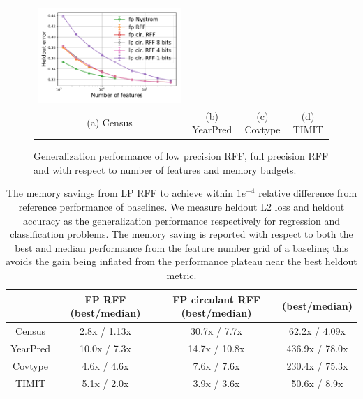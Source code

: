 \begin{figure}
\begin{tabular}{c@{\hskip 0in}c@{\hskip 0in}c@{\hskip 0in}c}
		\includegraphics[width=0.3\linewidth]{figures/timit_error_vs_n_feat.pdf} \\
		(a) Census & (b) YearPred & (c) Covtype & (d) TIMIT \\
	\end{tabular}
	\caption{Generalization performance of low precision RFF, full precision RFF and \Nystrom with respect to number of features and memory budgets.}
	\label{fig:generalization_col}
\end{figure}


\begin{table}
	\centering
	\begin{tabular}{c c c c}
		\hline
		& FP RFF (best/median) & FP circulant RFF (best/median) & \Nystrom (best/median) \\
		\hline
		\hline
		Census & 2.8x / 1.13x & 30.7x / 7.7x & 62.2x / 4.09x \\
		YearPred & 10.0x / 7.3x & 14.7x / 10.8x & 436.9x / 78.0x \\ 
		Covtype & 4.6x / 4.6x & 7.6x / 7.6x & 230.4x / 75.3x \\ 
		TIMIT & 5.1x / 2.0x & 3.9x / 3.6x & 50.6x / 8.9x \\ 
		\hline
	\end{tabular}
	\caption{The memory savings from LP RFF to achieve within $1e^{-4}$ relative difference from reference performance of baselines. We measure heldout L2 loss and heldout accuracy as the generalization performance respectively for regression and classification problems. The memory saving is reported with respect to both the best and median performance from the feature number grid of a baseline; this avoids the gain being inflated from the performance plateau near the best heldout metric. }
	\label{fig:mem_saving}
\end{table}

